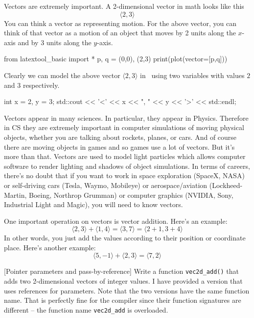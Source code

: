 Vectors are extremely important.
A 2-dimensional vector in math looks like this
\[
\langle 2, 3 \rangle
\]
You can think a vector as representing motion.
For the above vector, you can think of that
vector as a motion of an object that moves
by 2 units along the $x$-axis and
by 3 units along the $y$-axis.

\begin{python}
from latextool_basic import *
p, q = (0,0), (2,3)
print(plot(vector=[p,q]))
\end{python}

Clearly we can model the above vector
$\langle 2, 3 \rangle$
in \cpp\
using two variables with values $2$ and $3$ respectively.
\begin{console}
int x = 2, y = 3;
std::cout << '<' << x << ", " << y << '>' << std::endl;
\end{console}

Vectors appear in many sciences. 
In particular, they appear in Physics.
Therefore in CS they are 
extremely important in computer simulations of moving physical objects, whether
you are talking about rockets, planes, or cars.
And of course there are moving objects in games
and so games use a lot of vectors.
But it's more than that.
Vectors are used to model light particles which allows
computer software to render lighting and shadows of object simulations.
In terms of careers, there's no doubt that if you want to work in
space exploration (SpaceX, NASA) or self-driving cars (Tesla, Waymo,
Mobileye) or aerospace/aviation (Lockheed-Martin, Boeing, Northrop Grumman)
or computer graphics (NVIDIA, Sony, Industrial Light and Magic), you
will need to know vectors.

One important operation on vectors is vector addition.
Here's an example: 
\[
\langle 2, 3 \rangle
+
\langle 1, 4 \rangle
=
\langle 3, 7 \rangle
=
\langle 2+1, 3+4 \rangle
\]
In other words, you just add the values according to their
position or coordinate place.
Here's another example:
\[
\langle 5, -1 \rangle
+
\langle 2, 3 \rangle
=
\langle 7, 2 \rangle
\]

 [Pointer parameters and pass-by-reference]
Write a function \verb!vec2d_add()! that adds two 2-dimensional vectors
of integer values.
I have provided a version that uses references for parameters.
Note that the two versions have the same function name.
That is perfectly fine for the compiler since their function
signatures are different -- the function name \verb!vec2d_add!
is overloaded.

